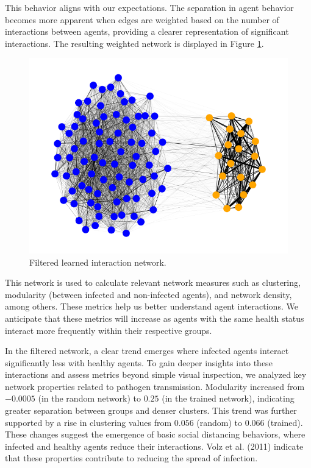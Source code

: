 \documentclass[9pt]{IEEEtran}
\begin{document}
This behavior aligns with our expectations. The separation in agent behavior becomes more apparent when edges are weighted based on the number of interactions between agents, providing a clearer representation of significant interactions. The resulting weighted network is displayed in Figure \ref{fig:filtered_net}.

\begin{figure}[hbt]
    \centering
    \includegraphics[width=0.9\linewidth]{filteredNet.png}
    \caption{Filtered learned interaction network.}
    \label{fig:filtered_net}
\end{figure}

This network is used to calculate relevant network measures such as clustering, modularity (between infected and non-infected agents), and network density, among others. These metrics help us better understand agent interactions. We anticipate that these metrics will increase as agents with the same health status interact more frequently within their respective groups.

In the filtered network, a clear trend emerges where infected agents interact significantly less with healthy agents. To gain deeper insights into these interactions and assess metrics beyond simple visual inspection, we analyzed key network properties related to pathogen transmission. Modularity increased from $-0.0005$ (in the random network) to $0.25$ (in the trained network), indicating greater separation between groups and denser clusters. This trend was further supported by a rise in clustering values from $0.056$ (random) to $0.066$ (trained). These changes suggest the emergence of basic social distancing behaviors, where infected and healthy agents reduce their interactions. Volz et al. (2011) \cite{volz2011effects} indicate that these properties contribute to reducing the spread of infection.
\end{document}
